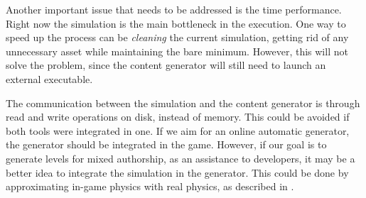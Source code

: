 Another important issue that needs to be addressed is the time performance. Right now the simulation is the main bottleneck in the execution. One way to speed up the process can be \textit{cleaning} the current simulation, getting rid of any unnecessary asset while maintaining the bare minimum. However, this will not solve the problem, since the content generator will still need to launch an external executable.

The communication between the simulation and the content generator is through read and write operations on disk, instead of memory. This could be avoided if both tools were integrated in one. If we aim for an online automatic generator, the generator should be integrated in the game. However, if our goal is to generate levels for mixed authorship, as an assistance to developers, it may be a better idea to integrate the simulation in the generator. This could be done by approximating in-game physics with real physics, as described in \cite{blum1970stability}. 



